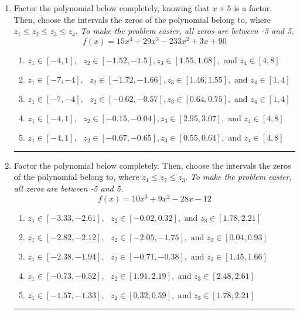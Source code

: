 \documentclass[14pt]{extbook}
\newcommand{\litem}[1]{\item#1\hspace*{-1cm}\rule{\textwidth}{0.4pt}}
\begin{document}
\begin{enumerate}
{\begin{enumerate}[label=\Alph*.]
\end{enumerate} }
\litem{
Factor the polynomial below completely, knowing that $x + 5$ is a factor. Then, choose the intervals the zeros of the polynomial belong to, where $z_1 \leq z_2 \leq z_3 \leq z_4$. \textit{To make the problem easier, all zeros are between -5 and 5.}\[ f(x) = 15x^{4} +29 x^{3} -233 x^{2} +3 x + 90 \]\begin{enumerate}[label=\Alph*.]
\item \( z_1 \in [-4, 1], \text{   }  z_2 \in [-1.52, -1.5], z_3 \in [1.55, 1.68], \text{   and   } z_4 \in [4, 8] \)
\item \( z_1 \in [-7, -4], \text{   }  z_2 \in [-1.72, -1.66], z_3 \in [1.46, 1.55], \text{   and   } z_4 \in [1, 4] \)
\item \( z_1 \in [-7, -4], \text{   }  z_2 \in [-0.62, -0.57], z_3 \in [0.64, 0.75], \text{   and   } z_4 \in [1, 4] \)
\item \( z_1 \in [-4, 1], \text{   }  z_2 \in [-0.15, -0.04], z_3 \in [2.95, 3.07], \text{   and   } z_4 \in [4, 8] \)
\item \( z_1 \in [-4, 1], \text{   }  z_2 \in [-0.67, -0.65], z_3 \in [0.55, 0.64], \text{   and   } z_4 \in [4, 8] \)

\end{enumerate} }
\litem{
Factor the polynomial below completely. Then, choose the intervals the zeros of the polynomial belong to, where $z_1 \leq z_2 \leq z_3$. \textit{To make the problem easier, all zeros are between -5 and 5.}\[ f(x) = 10x^{3} +9 x^{2} -28 x -12 \]\begin{enumerate}[label=\Alph*.]
\item \( z_1 \in [-3.33, -2.61], \text{   }  z_2 \in [-0.02, 0.32], \text{   and   } z_3 \in [1.78, 2.21] \)
\item \( z_1 \in [-2.82, -2.12], \text{   }  z_2 \in [-2.05, -1.75], \text{   and   } z_3 \in [0.04, 0.93] \)
\item \( z_1 \in [-2.38, -1.94], \text{   }  z_2 \in [-0.71, -0.38], \text{   and   } z_3 \in [1.45, 1.66] \)
\item \( z_1 \in [-0.73, -0.52], \text{   }  z_2 \in [1.91, 2.19], \text{   and   } z_3 \in [2.48, 2.61] \)
\item \( z_1 \in [-1.57, -1.33], \text{   }  z_2 \in [0.32, 0.59], \text{   and   } z_3 \in [1.78, 2.21] \)


\end{enumerate}}
\end{enumerate}
\end{document}
